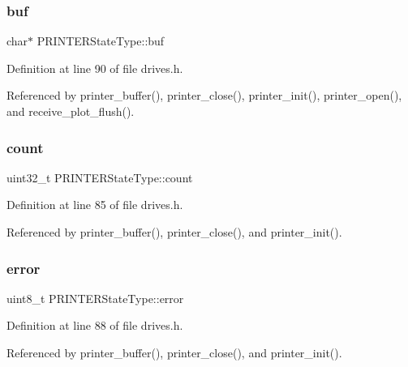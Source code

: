 \subsubsection{\texorpdfstring{buf}{buf}}
{\footnotesize\ttfamily char$\ast$ P\+R\+I\+N\+T\+E\+R\+State\+Type\+::buf}



Definition at line 90 of file drives.\+h.



Referenced by printer\+\_\+buffer(), printer\+\_\+close(), printer\+\_\+init(), printer\+\_\+open(), and receive\+\_\+plot\+\_\+flush().

\mbox{\label{structPRINTERStateType_ae115fc351910f3801e37b31f254fb8f4}} 
\subsubsection{\texorpdfstring{count}{count}}
{\footnotesize\ttfamily uint32\+\_\+t P\+R\+I\+N\+T\+E\+R\+State\+Type\+::count}



Definition at line 85 of file drives.\+h.



Referenced by printer\+\_\+buffer(), printer\+\_\+close(), and printer\+\_\+init().

\mbox{\label{structPRINTERStateType_a6e5b550f5396901febd5475445132dd0}} 
\subsubsection{\texorpdfstring{error}{error}}
{\footnotesize\ttfamily uint8\+\_\+t P\+R\+I\+N\+T\+E\+R\+State\+Type\+::error}



Definition at line 88 of file drives.\+h.



Referenced by printer\+\_\+buffer(), printer\+\_\+close(), and printer\+\_\+init().

\mbox{\label{structPRINTERStateType_a791c78d68d169f9d2e60d34b890e520a}} 
